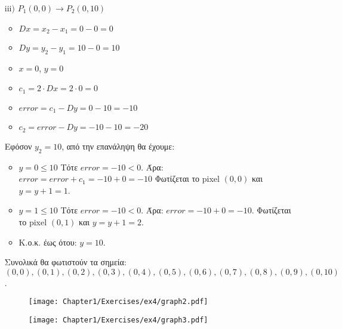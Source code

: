 \begin{solution}
\begin{enumerate}
\item[$\mathrm{iii)}$] $P_1(0, 0) \to P_2(0, 10)$
    
    \begin{itemize}
        \item  $Dx = x_2 - x_1 = 0 - 0 = 0$
        \item  $Dy = y_2 - y_1 = 10 - 0 = 10$
        \item  $x = 0$, $y = 0$
        \item  $c_1 = 2 \cdot Dx = 2 \cdot 0 = 0$
        \item  $error = c_1 - Dy = 0 - 10 = -10$
        \item  $c_2 = error - Dy = -10 - 10 = -20$
	\end{itemize}   
	
Εφόσον $y_2 = 10$, από την επανάληψη θα έχουμε:    

        \begin{itemize}
            \item \underline{$y = 0 \leq 10$}  \newline 
            Τότε $error = -10 < 0$. Άρα: \newline 
			$error = error + c_1 = -10 + 0 = -10$           
			Φωτίζεται το pixel $(0,0)$ και $y = y+1 = 1$.

            \item \underline{$y = 1 \leq 10$}  \newline 
            Τότε $error = -10 < 0$. Άρα: \newline
            $error = -10 + 0 = -10$. Φωτίζεται το pixel $(0,1)$ και $y = y+1 = 2$.
            \item  Κ.ο.κ. έως ότου: $y = 10$.
        \end{itemize}
Συνολικά θα φωτιστούν τα σημεία: \newline $(0, 0), (0, 1), (0, 2), (0, 3), (0, 4), (0, 5), (0, 6), (0, 7), (0,8), (0,9), (0, 10)$.


\begin{figure}[h!]
	\begin{minipage}[b]{0.48\textwidth} %
		\begin{center}
		   \texttt{[image: Chapter1/Exercises/ex4/graph2.pdf]}
		\end{center}    
	\end{minipage}%
	\hfill
	\begin{minipage}[b]{0.48\textwidth} %
	    \begin{center}
		    \texttt{[image: Chapter1/Exercises/ex4/graph3.pdf]}
		\end{center}    
	\end{minipage}


\end{figure}
\end{enumerate}
\end{solution}
